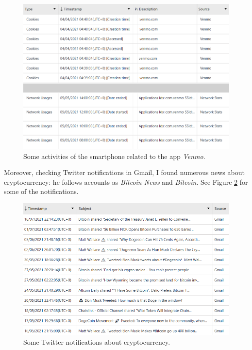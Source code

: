 \documentclass[12pt]{article}
\begin{document}
\begin{figure}[!ht]
    \centering
    \includegraphics[width=\textwidth]{images/venmo1.png}
    \caption{Some activities of the smartphone related to the app \textit{Venmo}.}
    \label{fig:crypto}
\end{figure}

Moreover, checking Twitter notifications in Gmail, I found numerous news about cryptocurrency: he follows accounts as \textit{Bitcoin News} and \textit{Bitcoin}. See Figure \ref{fig:twitter} for some of the notifications.

\begin{figure}[!ht]
    \centering
    \includegraphics[width=\textwidth]{images/gmail-crypto.png}
    \caption{Some Twitter notifications about cryptocurrency.}
    \label{fig:twitter}
\end{figure}
\end{document}
